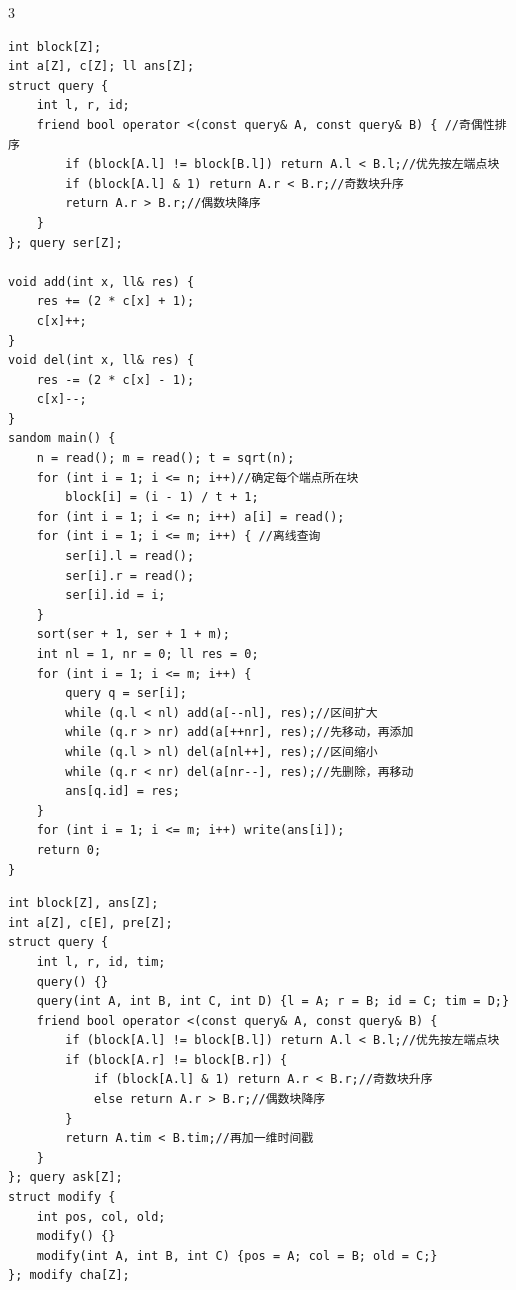 \documentclass[8pt]{extarticle}
\begin{document}
\begin{multicols*}{3}
\begin{lstlisting}
int block[Z];
int a[Z], c[Z]; ll ans[Z];
struct query {
    int l, r, id;
    friend bool operator <(const query& A, const query& B) { //奇偶性排序
        if (block[A.l] != block[B.l]) return A.l < B.l;//优先按左端点块
        if (block[A.l] & 1) return A.r < B.r;//奇数块升序
        return A.r > B.r;//偶数块降序
    }
}; query ser[Z];

void add(int x, ll& res) {
    res += (2 * c[x] + 1);
    c[x]++;
}
void del(int x, ll& res) {
    res -= (2 * c[x] - 1);
    c[x]--;
}
sandom main() {
    n = read(); m = read(); t = sqrt(n);
    for (int i = 1; i <= n; i++)//确定每个端点所在块
        block[i] = (i - 1) / t + 1;
    for (int i = 1; i <= n; i++) a[i] = read();
    for (int i = 1; i <= m; i++) { //离线查询
        ser[i].l = read();
        ser[i].r = read();
        ser[i].id = i;
    }
    sort(ser + 1, ser + 1 + m);
    int nl = 1, nr = 0; ll res = 0;
    for (int i = 1; i <= m; i++) {
        query q = ser[i];
        while (q.l < nl) add(a[--nl], res);//区间扩大
        while (q.r > nr) add(a[++nr], res);//先移动，再添加
        while (q.l > nl) del(a[nl++], res);//区间缩小
        while (q.r < nr) del(a[nr--], res);//先删除，再移动
        ans[q.id] = res;
    }
    for (int i = 1; i <= m; i++) write(ans[i]);
    return 0;
}
\end{lstlisting}

\begin{lstlisting}
int block[Z], ans[Z];
int a[Z], c[E], pre[Z];
struct query {
    int l, r, id, tim;
    query() {}
    query(int A, int B, int C, int D) {l = A; r = B; id = C; tim = D;}
    friend bool operator <(const query& A, const query& B) {
        if (block[A.l] != block[B.l]) return A.l < B.l;//优先按左端点块
        if (block[A.r] != block[B.r]) {
            if (block[A.l] & 1) return A.r < B.r;//奇数块升序
            else return A.r > B.r;//偶数块降序
        }
        return A.tim < B.tim;//再加一维时间戳
    }
}; query ask[Z];
struct modify {
    int pos, col, old;
    modify() {}
    modify(int A, int B, int C) {pos = A; col = B; old = C;}
}; modify cha[Z];


\end{lstlisting}
\end{multicols*}
\end{document}
